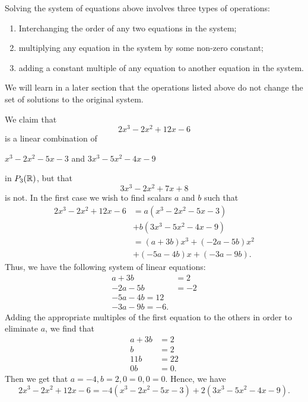 Solving the system of equations above involves three types of operations:
\begin{enumerate}
    \item Interchanging the order of any two equations in the system;
    \item multiplying any equation in the system by some non-zero constant;
    \item adding a constant multiple of any equation to another equation in the system.
\end{enumerate}
We will learn in a later section that the operations listed above do not change the set of solutions to the original system.

\begin{eg}
    We claim that 
    \[  2x^{3} - 2x^{2} + 12x - 6 \] is a linear combination of
    \begin{center}
        \( x^{3} - 2x^{2} - 5x - 3  \) and \( 3x^{3} - 5x^{2} - 4x - 9  \) 
    \end{center}
    in \( P_{3}(\mathbb{R} ) \), but that 
    \[  3x^{3} - 2x^{2} + 7x + 8  \] is not. In the first case we wish to find scalars \( a \) and \( b  \) such that 
    \begin{align*}
        2x^{3} - 2x^{2} + 12x - 6 &= a(x^{3} - 2x^{2} - 5x - 3 ) \\ 
                                  &+ b(3x^{3} - 5x^{2} - 4x - 9)  \\
                                  &= (a + 3b)x^{3} + (-2a-5b)x^{2} \\  
                                  &+ (-5a-4b)x + (-3a - 9b). 
    \end{align*}
    Thus, we have the following system of linear equations:
    \begin{align*}
       a + 3b  &= 2 \\
       -2a - 5b &= -2 \\ 
       -5a - 4b = 12 \\
       -3a - 9b = -6.
    \end{align*}
    Adding the appropriate multiples of the first equation to the others in order to eliminate \( a  \), we find that 
    \begin{align*}
        a + 3b &= 2  \\
        b &= 2  \\
        11b &= 22 \\
        0b &= 0.
    \end{align*}
    Then we get that \( a = -4  , b = 2 , 0 = 0 , 0= 0  \). Hence, we have
 \[ 2x^{3} - 2x^{2} + 12x - 6 = -4(x^{3} - 2x^{2} - 5x - 3 )  + 2(3x^{3} - 5x^{2} - 4x - 9). \]  

\end{eg}
